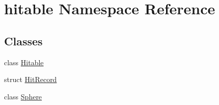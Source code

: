\hypertarget{namespacehitable}{}\section{hitable Namespace Reference}
\label{namespacehitable}
\subsection*{Classes}
\begin{DoxyCompactItemize}
\item 
class \mbox{\hyperlink{classhitable_1_1Hitable}{Hitable}}
\item 
struct \mbox{\hyperlink{structhitable_1_1HitRecord}{Hit\+Record}}
\item 
class \mbox{\hyperlink{classhitable_1_1Sphere}{Sphere}}
\end{DoxyCompactItemize}
